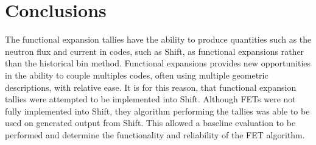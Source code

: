 \documentclass[10tma4paper]{article}
\begin{document}
\section{Conclusions}\label{conclusion}
The functional expansion tallies have the ability to produce quantities such as the neutron flux and current in codes, such as Shift, as functional expansions rather than the historical bin method. Functional expansions provides new opportunities in the ability to couple multiples codes, often using multiple geometric descriptions, with relative ease. It is for this reason, that functional expansion tallies were attempted to be implemented into Shift. Although FETs were not fully implemented into Shift, they algorithm performing the tallies was able to be used on generated output from Shift. This allowed a baseline evaluation to be performed and determine the functionality and reliability of the FET algorithm.
\end{document}
